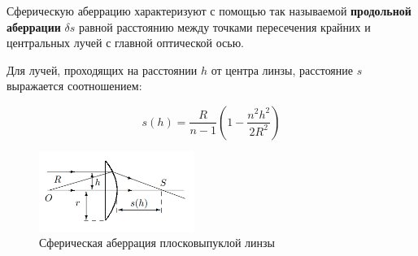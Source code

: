 	Сферическую аберрацию характеризуют с помощью так называемой \textbf{продольной аберрации} $\delta s$ равной расстоянию между точками пересечения крайних и центральных лучей с главной оптической осью.
	
	Для лучей, проходящих на расстоянии $h$ от центра линзы, расстояние $s$ выражается соотношением:
	
	\begin{equation}
		s(h) = \frac{R}{n - 1} \left(1 - \frac{n^2 h^2}{2 R^2} \right)
	\end{equation}
	
	\begin{figure}
		\includegraphics[width = 0.45\textwidth]{images/aberation_equation.png}
		\caption{Сферическая аберрация плосковыпуклой линзы}
		\label{fig:aberration_equation}
	\end{figure}

